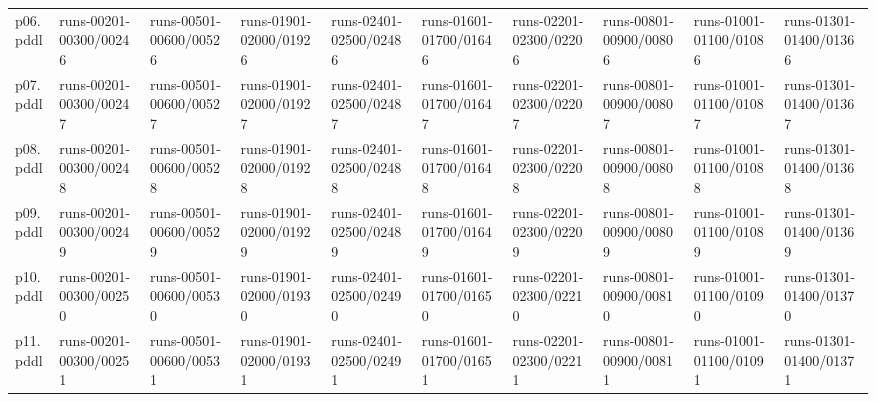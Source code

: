 \documentclass{article}
\begin{document}
\begin{tabular}{@{}lrrrrrrrrr@{}}
p06.pddl & \multicolumn{1}{|l|}{runs-00201-00300/00246} & \multicolumn{1}{|l|}{runs-00501-00600/00526} & \multicolumn{1}{|l|}{runs-01901-02000/01926} & \multicolumn{1}{|l|}{runs-02401-02500/02486} & \multicolumn{1}{|l|}{runs-01601-01700/01646} & \multicolumn{1}{|l|}{runs-02201-02300/02206} & \multicolumn{1}{|l|}{runs-00801-00900/00806} & \multicolumn{1}{|l|}{runs-01001-01100/01086} & \multicolumn{1}{|l|}{runs-01301-01400/01366} \\
p07.pddl & \multicolumn{1}{|l|}{runs-00201-00300/00247} & \multicolumn{1}{|l|}{runs-00501-00600/00527} & \multicolumn{1}{|l|}{runs-01901-02000/01927} & \multicolumn{1}{|l|}{runs-02401-02500/02487} & \multicolumn{1}{|l|}{runs-01601-01700/01647} & \multicolumn{1}{|l|}{runs-02201-02300/02207} & \multicolumn{1}{|l|}{runs-00801-00900/00807} & \multicolumn{1}{|l|}{runs-01001-01100/01087} & \multicolumn{1}{|l|}{runs-01301-01400/01367} \\
p08.pddl & \multicolumn{1}{|l|}{runs-00201-00300/00248} & \multicolumn{1}{|l|}{runs-00501-00600/00528} & \multicolumn{1}{|l|}{runs-01901-02000/01928} & \multicolumn{1}{|l|}{runs-02401-02500/02488} & \multicolumn{1}{|l|}{runs-01601-01700/01648} & \multicolumn{1}{|l|}{runs-02201-02300/02208} & \multicolumn{1}{|l|}{runs-00801-00900/00808} & \multicolumn{1}{|l|}{runs-01001-01100/01088} & \multicolumn{1}{|l|}{runs-01301-01400/01368} \\
p09.pddl & \multicolumn{1}{|l|}{runs-00201-00300/00249} & \multicolumn{1}{|l|}{runs-00501-00600/00529} & \multicolumn{1}{|l|}{runs-01901-02000/01929} & \multicolumn{1}{|l|}{runs-02401-02500/02489} & \multicolumn{1}{|l|}{runs-01601-01700/01649} & \multicolumn{1}{|l|}{runs-02201-02300/02209} & \multicolumn{1}{|l|}{runs-00801-00900/00809} & \multicolumn{1}{|l|}{runs-01001-01100/01089} & \multicolumn{1}{|l|}{runs-01301-01400/01369} \\
p10.pddl & \multicolumn{1}{|l|}{runs-00201-00300/00250} & \multicolumn{1}{|l|}{runs-00501-00600/00530} & \multicolumn{1}{|l|}{runs-01901-02000/01930} & \multicolumn{1}{|l|}{runs-02401-02500/02490} & \multicolumn{1}{|l|}{runs-01601-01700/01650} & \multicolumn{1}{|l|}{runs-02201-02300/02210} & \multicolumn{1}{|l|}{runs-00801-00900/00810} & \multicolumn{1}{|l|}{runs-01001-01100/01090} & \multicolumn{1}{|l|}{runs-01301-01400/01370} \\
p11.pddl & \multicolumn{1}{|l|}{runs-00201-00300/00251} & \multicolumn{1}{|l|}{runs-00501-00600/00531} & \multicolumn{1}{|l|}{runs-01901-02000/01931} & \multicolumn{1}{|l|}{runs-02401-02500/02491} & \multicolumn{1}{|l|}{runs-01601-01700/01651} & \multicolumn{1}{|l|}{runs-02201-02300/02211} & \multicolumn{1}{|l|}{runs-00801-00900/00811} & \multicolumn{1}{|l|}{runs-01001-01100/01091} & \multicolumn{1}{|l|}{runs-01301-01400/01371} \\

\end{tabular}
\end{document}
